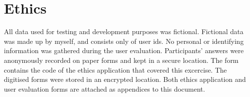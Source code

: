 \chapter{Ethics}
All data used for testing and development purposes was fictional. Fictional data was made up by myself, and consists only of user ids. No personal or identifying information was gathered during the user evaluation. Participants' answers were anonymously recorded on paper forms and kept in a secure location. The form contains the code of the ethics application that covered this excercise. The digitised forms were stored in an encrypted location. Both ethics application and user evaluation forms are attached as appendices to this document.